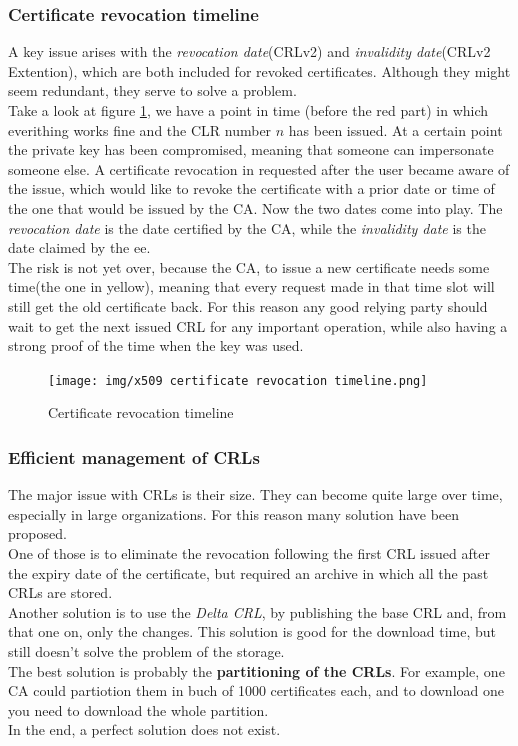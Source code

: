 \subsubsection{Certificate revocation timeline}
A key issue arises with the \textit{revocation date}(CRLv2) and
\textit{invalidity date}(CRLv2 Extention), which are both included for
revoked certificates. Although they might seem redundant, they serve
to solve a problem.\\
Take a look at figure \ref{fig:certificate revocation timeline}, we
have a point in time (before the red part) in which everithing works
fine and the CLR number $n$ has been issued. At a certain point the
private key has been compromised, meaning that someone can impersonate
someone else. A certificate revocation in requested after the user
became aware of the issue, which would like to revoke the certificate
with a prior date or time of the one that would be issued by the CA.
Now the two dates come into play. The \textit{revocation date} is the 
date certified by the CA, while the \textit{invalidity date} is the 
date claimed by the ee.\\
The risk is not yet over, because the CA, to issue a new certificate
needs some time(the one in yellow), meaning that every request made 
in that time slot will still get the old certificate back. For this
reason any good relying party should wait to get the next issued CRL
for any important operation, while also having a strong proof of the
time when the key was used.

\begin{figure}[H]
  \centering
  \texttt{[image: img/x509 certificate
  revocation timeline.png]}
  \label{fig:certificate revocation timeline}

  \caption{Certificate revocation timeline}
\end{figure}
\subsubsection{Efficient management of CRLs}
The major issue with CRLs is their size. They can become quite large
over time, especially in large organizations. For this reason many
solution have been proposed.\\
One of those is to eliminate the revocation following the first CRL
issued after the expiry date of the certificate, but required an
archive in which all the past CRLs are stored.\\
Another solution is to use the \textit{Delta CRL}, by publishing the
base CRL and, from that one on, only the changes. This solution is
good for the download time, but still doesn't solve the problem of the 
storage.\\
The best solution is probably the \textbf{partitioning of the CRLs}.
For example, one CA could partiotion them in buch of 1000 certificates 
each, and to download one you need to download the whole partition.\\
In the end, a perfect solution does not exist.

